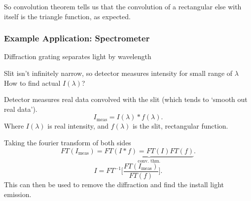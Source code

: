 So convolution theorem tells us that the convolution of a rectangular else with itself is the triangle function, as expected.

\subsubsection{Example Application: Spectrometer}
Diffraction grating separates light by wavelength


Slit isn't infinitely narrow, so detector measures intensity for small range of $ \lambda $ How to find actual $ I(\lambda) $?

Detector measures real data convolved with the slit (which tends to `smooth out real data').
\[
I_{\text{meas}}=I(\lambda)*f(\lambda).\] 
Where $ I(\lambda) $ is real intensity, and $ f(\lambda) $ is the slit, rectangular function.

Taking the fourier transform of both sides
\[
FT(I_{\text{meas}})=\underbrace{FT(I*f)=FT(I)FT(f)}_\text{conv.\ thm.}.\] 
\[
I=FT^{-1}\bigg[\frac{FT(I_{\text{meas}})}{FT(f)}\bigg].\] 
This can then be used to remove the diffraction and find the install light emission.











